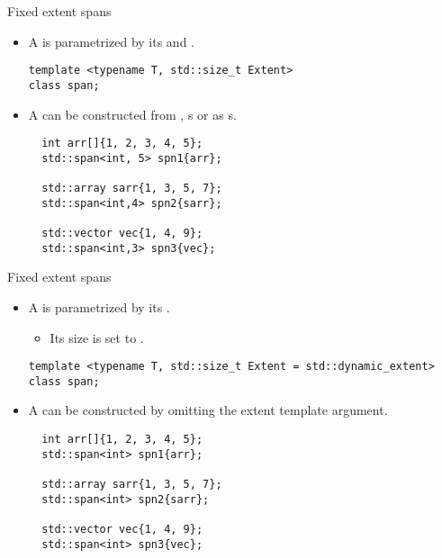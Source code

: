 \begin{frame}[t,fragile]{Fixed extent spans}
\begin{itemize}
  \item A  is parametrized by
        its  and .
\begin{lstlisting}
template <typename T, std::size_t Extent>
class span;
\end{lstlisting}

    \item A  can be constructed from
          , s 
          or  as s.
\begin{lstlisting}
  int arr[]{1, 2, 3, 4, 5};
  std::span<int, 5> spn1{arr};

  std::array sarr{1, 3, 5, 7};
  std::span<int,4> spn2{sarr};

  std::vector vec{1, 4, 9};
  std::span<int,3> spn3{vec};
\end{lstlisting}
\end{itemize}
\end{frame}

\begin{frame}[t,fragile]{Fixed extent spans}
\begin{itemize}
  \item A  is parametrized by
        its .
    \begin{itemize}
      \item Its size is set to .
    \end{itemize}
\begin{lstlisting}
template <typename T, std::size_t Extent = std::dynamic_extent>
class span;
\end{lstlisting}

    \item A  can be constructed by
          omitting the extent template argument.
\begin{lstlisting}
  int arr[]{1, 2, 3, 4, 5};
  std::span<int> spn1{arr};

  std::array sarr{1, 3, 5, 7};
  std::span<int> spn2{sarr};

  std::vector vec{1, 4, 9};
  std::span<int> spn3{vec};
\end{lstlisting}
\end{itemize}
\end{frame}
